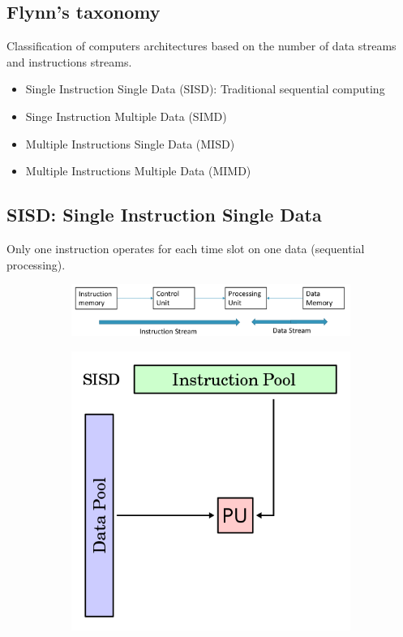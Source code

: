 \subsection{Flynn’s taxonomy}
Classification of computers architectures based on the number of data streams and instructions streams.
\begin{itemize}
    \item Single Instruction Single Data (SISD): Traditional sequential computing
    \item Singe Instruction Multiple Data (SIMD)
    \item Multiple Instructions Single Data (MISD)
    \item Multiple Instructions Multiple Data (MIMD)
\end{itemize}

\subsection{SISD: Single Instruction Single Data}
Only one instruction operates for
each time slot on one data (sequential processing).


\begin{figure}[ht]
\centering
\begin{subfigure}{.7\textwidth}
  \centering
  \includegraphics[width=.9\textwidth]{figure_parallel/sisd2.png}
\end{subfigure}%
\begin{subfigure}{.3\textwidth}
  \centering
  \includegraphics[width=.9\textwidth]{figure_parallel/SISD.png}
\end{subfigure}
\end{figure}

